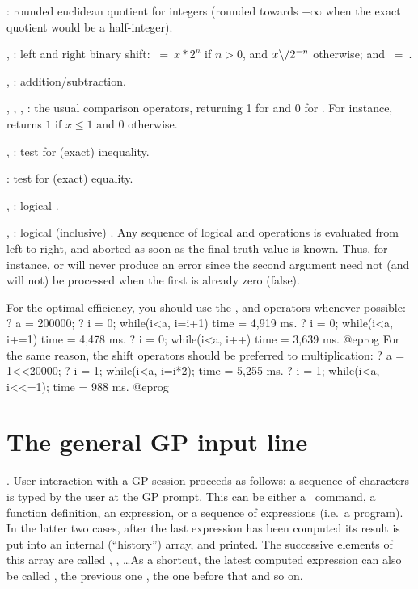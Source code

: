 \kbd{\bs/}: rounded euclidean quotient for integers (rounded towards
$+\infty$ when the exact quotient would be a half-integer).

\kbd{<<}, \kbd{>>}: left and right binary shift: $~=~x * 2^n$
if $n>0$, and $x \b{/} 2^{-n}$ otherwise; and
$~=~$.

%
\kbd{+}, \kbd{-}: addition/subtraction.

%
\kbd{<}, \kbd{>}, \kbd{<=}, \kbd{>=}: the usual comparison operators,
returning 1 for  and 0 for . For instance,
 returns $1$ if $x\le 1$ and $0$ otherwise.

\kbd{<>}, \kbd{!=}: test for (exact) inequality.

\kbd{==}: test for (exact) equality.

%
\kbd{\&}, \kbd{\&\&}: logical .

\kbd{|}, \kbd{||}: logical (inclusive) . Any sequence of logical
 and  operations is evaluated from left to right,
and aborted as soon as the final truth value is known. Thus, for instance,
 or  will never
produce an error since the second argument need not (and will not) be processed
when the first is already zero (false).

 For the optimal efficiency, you should use the
\kbd{++}, \kbd{--} and \kbd{=} operators whenever possible:
\bprog
? a = 200000;
? i = 0; while(i<a, i=i+1)
time = 4,919 ms.
? i = 0; while(i<a, i+=1)
time = 4,478 ms.
? i = 0; while(i<a, i++)
time = 3,639 ms.
@eprog
\noindent For the same reason, the shift operators should be preferred to
multiplication:
\bprog
? a = 1<<20000;
? i = 1; while(i<a, i=i*2);
time = 5,255 ms.
? i = 1; while(i<a, i<<=1);
time = 988 ms.
@eprog

\section{The general GP input line}
. User interaction with a GP session proceeds as
follows: a sequence of characters is typed by the user at the GP prompt. This
can be either a \b~command, a function definition, an expression, or a
sequence of expressions (i.e.~a program). In the latter two cases, after the
last expression has been computed its result is put into an internal
(``history'') array, and printed. The successive elements of this array are
called , , \dots As a shortcut, the latest computed
expression can also be called \kbd{\%}, the previous one , the one
before that  and so on.

